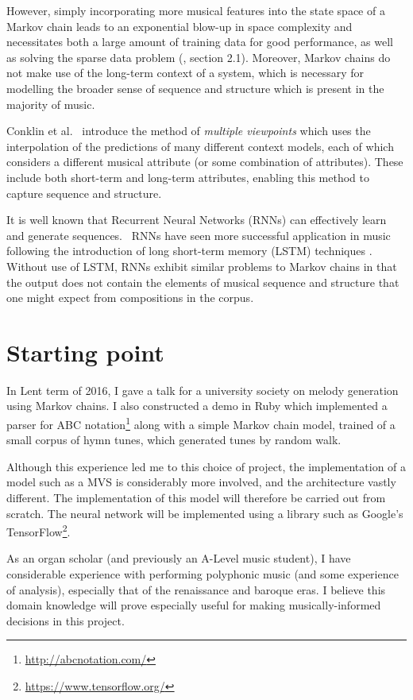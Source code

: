 \documentclass[12pt,a4paper,twoside]{article}
\begin{document}
However, simply incorporating more musical features into the state space of a
Markov chain leads to an exponential blow-up in space complexity and
necessitates both a large amount of training data for good performance, as well
as solving the sparse data problem (\cite{conklin2003music}, section 2.1).
Moreover, Markov chains do not make use of the long-term context of a system,
which is necessary for modelling the broader sense of sequence and structure
which is present in the majority of music.

Conklin et al.\ \cite{conklin1995viewpoints} introduce the method of
\emph{multiple viewpoints} which uses the interpolation of the predictions of
many different context models, each of which considers a different musical
attribute (or some combination of attributes). These include both short-term and
long-term attributes, enabling this method to capture sequence and structure.

It is well known that Recurrent Neural Networks (RNNs) can effectively learn and
generate sequences.\ \cite{graves2013generating} RNNs have seen more successful
application in music following the introduction of long short-term memory (LSTM)
techniques \cite{eck2002lstm}.  Without use of LSTM, RNNs exhibit similar
problems to Markov chains in that the output does not contain the elements of
musical sequence and structure that one might expect from compositions in the
corpus.

\section{Starting point}

In Lent term of 2016, I gave a talk for a university society on melody
generation using Markov chains. I also constructed a demo in Ruby which
implemented a parser for ABC notation\footnote{\url{http://abcnotation.com/}}
along with a simple Markov chain model, trained of a small corpus of hymn tunes,
which generated tunes by random walk. 

Although this experience led me to this choice of project, the implementation of
a model such as a MVS is considerably more involved, and
the architecture vastly different. The implementation of this model will
therefore be carried out from scratch.  The neural network will be implemented
using a library such as Google's
TensorFlow\footnote{\url{https://www.tensorflow.org/}}.

As an organ scholar (and previously an A-Level music student), I have
considerable experience with performing polyphonic music (and some experience of
analysis), especially that of the renaissance and baroque eras. I believe this
domain knowledge will prove especially useful for making musically-informed
decisions in this project. 
\end{document}

